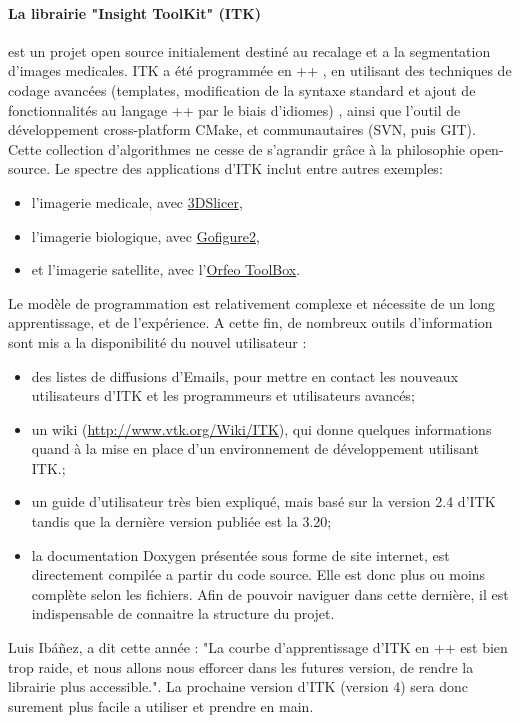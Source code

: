\paragraph{La librairie "Insight ToolKit" (ITK)} est un projet open source initialement destiné au recalage et a la segmentation d'images medicales. ITK a été programmée en \C++ , en utilisant des techniques de codage avancées (templates, modification de la syntaxe standard et ajout de fonctionnalités au langage \C++ par le biais d'idiomes) , ainsi que l'outil de développement cross-platform CMake, et communautaires (SVN, puis GIT). 
Cette collection d'algorithmes ne cesse de s'agrandir grâce à la philosophie open-source. Le spectre des applications d'ITK inclut entre autres exemples:  
\begin{itemize}
  \item l'imagerie medicale, avec \href{http://www.slicer.org/}{3DSlicer},
  \item l'imagerie biologique, avec \href{http://gofigure2.sourceforge.net/}{Gofigure2},
  \item et l'imagerie satellite, avec l'\href{http://www.orfeo-toolbox.org/otb/}{Orfeo ToolBox}.
\end{itemize}
Le modèle de programmation est relativement complexe et nécessite de un long apprentissage, et de l'expérience. A cette fin, de nombreux outils d'information sont mis a la disponibilité du nouvel utilisateur :
\begin{itemize}
  \item des listes de diffusions d'Emails, pour mettre en contact les nouveaux utilisateurs d'ITK et les programmeurs et utilisateurs avancés;
  \item un wiki (\url{http://www.vtk.org/Wiki/ITK}), qui donne quelques informations quand à la mise en place d'un environnement de développement utilisant ITK.;
  \item un guide d'utilisateur très bien expliqué, mais basé sur la version 2.4 d'ITK tandis que la dernière version publiée est la 3.20;
  \item la documentation Doxygen présentée sous forme de site internet, est directement compilée a partir du code source. Elle est donc plus ou moins complète selon les fichiers. Afin de pouvoir naviguer dans cette dernière, il est indispensable de connaitre la structure du projet.
\end{itemize}
Luis Ibáñez, a dit cette année : "La courbe d'apprentissage d'ITK en \C++ est bien trop raide, et nous allons nous efforcer dans les futures version, de rendre la librairie plus accessible.". La prochaine version d'ITK (version 4) sera donc surement plus facile a utiliser et prendre en main.

